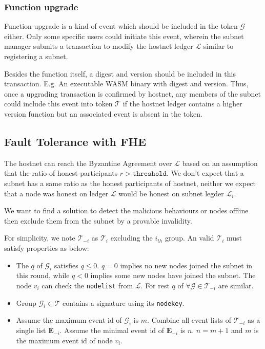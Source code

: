 \documentclass[11pt]{article}
\begin{document}
\subsubsection{Function upgrade}
Function upgrade is a kind of event which should be included in the token $\mathcal{G}$ either.
Only some specific users could initiate this event, wherein the subnet manager submits a transaction to modify the hostnet ledger $\mathcal{L}$ similar to registering a subnet.

Besides the function itself, a digest and version should be included in this transaction. E.g. An executable WASM binary with digest and version.
Thus, once a upgrading transaction is confirmed by hostnet, any members of the subnet could include this event into token $\mathcal{T}$ if the hostnet ledger contains a higher version function but an associated event is absent in the token.

\subsection{Fault Tolerance with FHE}
The hostnet can reach the Byzantine Agreement over $\mathcal{L}$ based on an assumption that the ratio of honest participants $r > \texttt{threshold}$.
We don{'}t expect that a subnet has a same ratio as the honest participants of hostnet, neither we expect that a node was honest on ledger $\mathcal{L}$ would be honest on subnet legder $\mathcal{L}_{i}$.

We want to find a solution to detect the malicious behaviours or nodes offline then exclude them from the subnet by a provable invalidity.

For simplicity, we note $\mathcal{T}_{-i}$ as $\mathcal{T}_{i}$ excluding the $i_{th}$ group. An valid $\mathcal{T}_{i}$ must satisfy properties as below:

\begin{itemize}
\item The $q$ of $\mathcal{G}_{i}$ satisfies \(q \leq 0\). $q=0$ implies no new nodes joined the subnet in this round, while $q < 0$ implies some new nodes have joined the subnet. The node $v_{i}$ can check the \texttt{nodelist} from $\mathcal{L}$.
For rest $q$ of $\forall \mathcal{G} \in \mathcal{T}_{-i}$ are similar.
\item Group $\mathcal{G}_{i} \in \mathcal{T}$ contains a signature using its \texttt{nodekey}.
\item Assume the maximum event id of $\mathcal{G}_{i}$ is $m$. Combine all event lists of $\mathcal{T}_{-i}$ as a single list $\mathbf{E}_{-i}$. Assume the minimal event id of $\mathbf{E}_{-i}$ is $n$.
\(n = m+1\) and $m$ is the maximum event id of node $v_{i}$.
\end{itemize}
\end{document}
